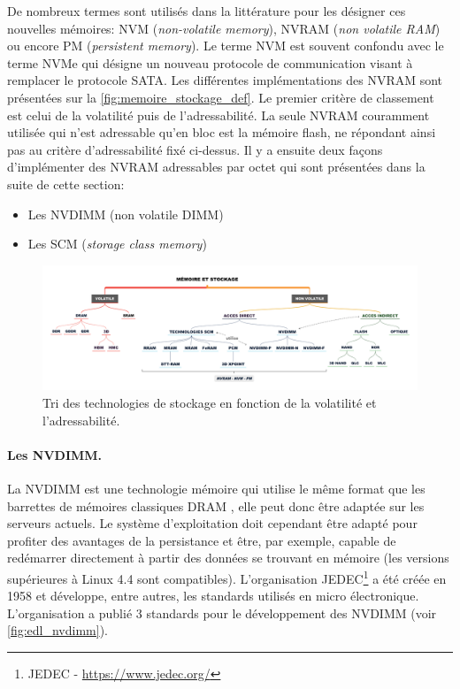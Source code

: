             De nombreux termes sont utilisés dans la littérature pour les désigner ces nouvelles mémoires: NVM (\textit{non-volatile memory}), NVRAM (\textit{non volatile RAM}) ou encore PM (\textit{persistent memory}). Le terme NVM est souvent confondu avec le terme NVMe qui désigne un nouveau protocole de communication visant à remplacer le protocole SATA. Les différentes implémentations des NVRAM sont présentées sur la \autoref{fig:memoire_stockage_def}. Le premier critère de classement est celui de la volatilité puis de l'adressabilité. La seule NVRAM couramment utilisée qui n'est adressable qu'en bloc est la mémoire flash, ne répondant ainsi pas au critère d'adressabilité fixé ci-dessus. Il y a ensuite deux façons d'implémenter des NVRAM adressables par octet qui sont présentées dans la suite de cette section:
            \begin{itemize}
                \item Les NVDIMM (non volatile DIMM) 
                \item Les SCM (\textit{storage class memory})
            \end{itemize}
            
            
            \begin{figure}
                \center
                \includegraphics[width=17cm]{images/memoire_stockage_def.png}
                \caption{\label{fig:memoire_stockage_def} Tri des technologies de stockage en fonction de la volatilité et l'adressabilité.}
            \end{figure}
    
    
    
    \paragraph{Les NVDIMM.}\label{sec:nvdimm}
    
        La NVDIMM est une technologie mémoire qui utilise le même format que les barrettes de mémoires classiques DRAM \cite{ChrisEvans2017}, elle peut donc être adaptée sur les serveurs actuels. Le système d'exploitation doit cependant être adapté pour profiter des avantages de la persistance et être, par exemple, capable de redémarrer directement à partir des données se trouvant en mémoire (les versions supérieures à Linux 4.4 sont compatibles). L'organisation JEDEC\footnote{JEDEC - \url{https://www.jedec.org/}} a été créée en 1958 et développe, entre autres, les standards utilisés en micro électronique. L'organisation a publié 3 standards pour le développement des NVDIMM (voir \autoref{fig:edl_nvdimm}).
    
